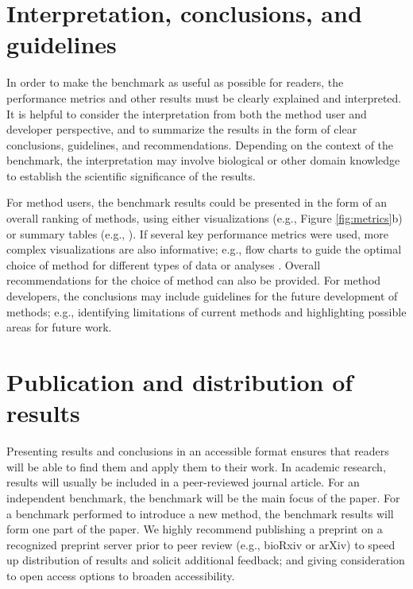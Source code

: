 \documentclass[12pt, a4paper]{article}
\begin{document}
\section*{Interpretation, conclusions, and guidelines}

In order to make the benchmark as useful as possible for readers, the performance metrics and other results must be clearly explained and interpreted. It is helpful to consider the interpretation from both the method user and developer perspective, and to summarize the results in the form of clear conclusions, guidelines, and recommendations. Depending on the context of the benchmark, the interpretation may involve biological or other domain knowledge to establish the scientific significance of the results.

For method users, the benchmark results could be presented in the form of an overall ranking of methods, using either visualizations (e.g., Figure \ref{fig:metrics}b) or summary tables (e.g., \citep{Aghaeepour2013, Weber2016}). If several key performance metrics were used, more complex visualizations are also informative; e.g., flow charts to guide the optimal choice of method for different types of data or analyses \citep{Saelens2018b}. Overall recommendations for the choice of method can also be provided. For method developers, the conclusions may include guidelines for the future development of methods; e.g., identifying limitations of current methods and highlighting possible areas for future work.




\section*{Publication and distribution of results}

Presenting results and conclusions in an accessible format ensures that readers will be able to find them and apply them to their work. In academic research, results will usually be included in a peer-reviewed journal article. For an independent benchmark, the benchmark will be the main focus of the paper. For a benchmark performed to introduce a new method, the benchmark results will form one part of the paper. We highly recommend publishing a preprint on a recognized preprint server prior to peer review (e.g., bioRxiv or arXiv) to speed up distribution of results and solicit additional feedback; and giving consideration to open access options to broaden accessibility.
\end{document}

